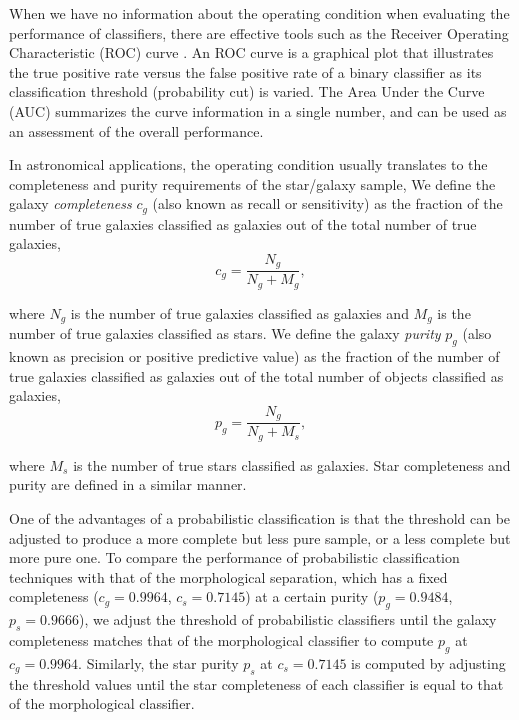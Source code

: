 \documentclass[useAMS,usenatbib]{mn2e}
\begin{document}
When we have no information about the operating condition
when evaluating the performance of classifiers,
there are effective tools such as
the Receiver Operating Characteristic (ROC) curve
\citep{swets2000better}.
An ROC curve is a graphical plot that illustrates the true positive rate
versus the false positive rate of a binary classifier
as its classification threshold (probability cut) is varied.
The Area Under the Curve (AUC) summarizes the curve information
in a single number,
and can be used as an assessment of the overall performance.

In astronomical applications,
the operating condition usually translates to
the completeness and purity requirements of the star/galaxy sample,
We define the galaxy \textit{completeness}
$c_g$ (also known as recall or sensitivity) as
the fraction of the number of true galaxies classified as galaxies
out of the total number of true galaxies,
\begin{equation}
c_g = \frac{N_g}{N_g + M_g},
\end{equation}

\noindent
where $N_g$ is the number of true galaxies classified as galaxies
and $M_g$ is the number of true galaxies classified as stars.
We define the galaxy \textit{purity} $p_g$ (also known as precision
or positive predictive value)
as the fraction of the number of true galaxies classified as galaxies
out of the total number of objects classified as galaxies, 
\begin{equation}
p_g = \frac{N_g}{N_g + M_s},
\end{equation}

\noindent
where $M_s$ is the number of true stars classified as galaxies.
Star completeness and purity are defined in a similar manner.


One of the advantages of a probabilistic classification is
that the threshold can be adjusted to produce
a more complete but less pure sample,
or a less complete but more pure one.
To compare the performance of probabilistic classification techniques
with that of the morphological separation,
which has a fixed completeness ($c_g = 0.9964$, $c_s = 0.7145$)
at a certain purity ($p_g = 0.9484$, $p_s = 0.9666$),
we adjust the threshold of probabilistic classifiers
until the galaxy completeness matches that of the morphological classifier
to compute $p_{g}$ at $c_g=0.9964$.
Similarly, the star purity $p_{s}$ at $c_{s}=0.7145$
is computed by adjusting the threshold values
until the star completeness of each classifier is equal to
that of the morphological classifier.
\end{document}
